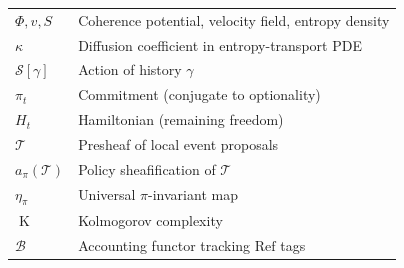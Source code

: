 \documentclass[12pt,a4paper]{article}
\theoremstyle{definition}
\theoremstyle{remark}
\newcommand{\RefOp}{\ensuremath{\mathrm{Ref}}}
\DeclareMathOperator{\Kc}{K}
\newcommand{\PhiF}{\Phi}
\newcommand{\vF}{v}
\newcommand{\SF}{S}
\begin{document}
\begin{center}
\begin{tabular}{ll}
$\PhiF,\vF,\SF$ & Coherence potential, velocity field, entropy density \\
$\kappa$ & Diffusion coefficient in entropy-transport PDE \\
$\mathcal{S}[\gamma]$ & Action of history $\gamma$ \\
$\pi_t$ & Commitment (conjugate to optionality) \\
$H_t$ & Hamiltonian (remaining freedom) \\
$\mathcal{T}$ & Presheaf of local event proposals \\
$a_\pi(\mathcal{T})$ & Policy sheafification of $\mathcal{T}$ \\
$\eta_\pi$ & Universal $\pi$-invariant map \\
$\Kc$ & Kolmogorov complexity \\
$\mathcal{B}$ & Accounting functor tracking $\RefOp$ tags \\
\bottomrule
\end{tabular}
\end{center}
\end{document}
